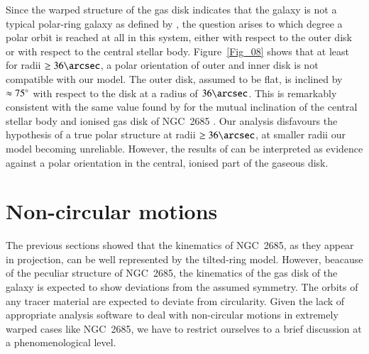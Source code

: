 \documentclass[oldversion]{aa}
\renewcommand{\deg}{\hbox{$^\circ$}}
\begin{document}
Since the warped structure of the gas disk indicates that the galaxy
is not a typical polar-ring galaxy as defined by
\citet[][]{Whitmore90}, the question arises to which degree a polar
orbit is reached at all in this system, either with respect to the
outer disk or with respect to the central stellar
body. Figure~\ref{Fig_08} shows that at least for radii $\geq
36\arcsec$, a polar orientation of outer and inner  disk is
not compatible with our model. The outer disk, assumed to be flat, is
inclined by $\approx 75\deg$ with respect to the disk at a radius of
$36\arcsec$. This is remarkably consistent with the same value found
by \citet[][]{Sarzi06} for the mutual inclination of the central
stellar body and ionised gas disk of NGC~2685 \citep[see
also][]{Nicholson87}. Our analysis disfavours the hypothesis of a true
polar structure at radii $\geq 36\arcsec$, at smaller radii our model
becoming unreliable. However, the results of \citet[][]{Sarzi06} can
be interpreted as evidence against a polar orientation in the central,
ionised part of the gaseous disk.
%
%
\section{Non-circular motions}
\label{Sect_7}
The previous sections showed that the kinematics of NGC~2685, as they
appear in projection, can be well represented by the tilted-ring
model. However, beacause of the peculiar structure of NGC~2685, the
kinematics of the gas disk of the galaxy is expected to show
deviations from the assumed symmetry. The orbits of any tracer
material are expected to deviate from circularity. Given the lack of
appropriate analysis software to deal with non-circular motions in
extremely warped cases like NGC~2685, we have to restrict ourselves to
a brief discussion at a phenomenological level.
\end{document}
